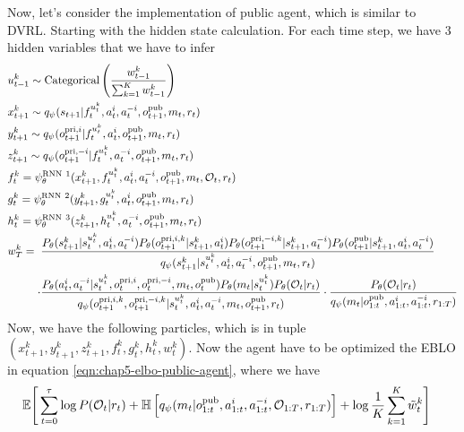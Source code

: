\label{sec:chap5-public-agent-implementation}
Now, let's consider the implementation of public agent, which is similar to DVRL. Starting with the hidden state calculation. For each time step, we have 3 hidden variables that we have to infer
\begin{equation}
\begin{aligned}
    &u^k_{t-1} \sim \text{Categorical}\left( \frac{w^k_{t-1}}{\sum^K_{k=1}w^k_{t-1}} \right) \\
    &x^k_{t+1} \sim q_\psi(s_{t+1} | f^{u^k_t}_t, a^i_t, a^{-i}_t, o^{\operatorname{pub}}_{t+1}, m_t, r_t) \\
    &y^k_{t+1} \sim q_\psi(o^{\operatorname{pri}, i}_{t+1} | f^{u^k_t}_t, a^i_t, o^{\operatorname{pub}}_{t+1}, m_t, r_t) \\ 
    &z^k_{t+1} \sim q_\psi(o^{\operatorname{pri}, -i}_{t+1} | f^{u^k_t}_t, a^{-i}_t, o^{\operatorname{pub}}_{t+1}, m_t, r_t) \\
    &f^k_t = \psi^{\text{RNN} \ 1}_\theta (x^k_{t+1}, f^{u^k_t}_t, a^i_t, a^{-i}_t, o^{\operatorname{pub}}_{t+1}, m_t, \mathcal{O}_t, r_t) \\
    &g^k_t = \psi^{\text{RNN} \ 2}_\theta (y^k_{t+1}, g^{u^k_t}_t, a^i_t, o^{\operatorname{pub}}_{t+1}, m_t, r_t) \\
    &h^k_t = \psi^{\text{RNN} \ 3}_\theta (z^k_{t+1}, h^{u^k_t}_t, a^{-i}_t, o^{\operatorname{pub}}_{t+1}, m_t, r_t) \\
    &w^k_T = \begin{aligned}[t]
        &\frac{P_\theta(s_{t+1}^k | s_t^{u^k_t}, a_t^i, a_t^{-i})P_\theta(o^{\operatorname{pri}, i, k}_{t+1} | s_{t+1}^k, a^i_t) P_\theta(o^{\operatorname{pri}, -i, k}_{t+1} | s_{t+1}^k, a^{-i}_t) P_\theta(o^{\operatorname{pub}}_{t+1} | s_{t+1}^k, a^i_t, a^{-i}_t)}{q_\psi(s_{t+1}^k | s_t^{u^k_t}, a^i_t, a^{-i}_t, o^{\operatorname{pub}}_{t+1}, m_t, r_t)} \\
        \cdot&\frac{P_\theta(a^i_t, a^{-i}_t | s_t^{u^k_t}, o^{\operatorname{pri}, i}_t, o^{\operatorname{pri}, -i}_t, m_t, o^{\operatorname{pub}}_t) P_\theta(m_t | s_t^{u^k_t}) P_\theta(\mathcal{O}_t | r_t)}{q_\psi(o^{\operatorname{pri}, i, k}_{t+1}, o^{\operatorname{pri}, -i, k}_{t+1} | s_t^{u^k_t}, a^i_t, a^{-i}_t, m_t, o^{\operatorname{pub}}_{t+1}, r_t)} \cdot \frac{P_\theta(\mathcal{O}_t | r_t)}{q_\psi(m_t | o^{\operatorname{pub}}_{1:t}, a^{i}_{1:t}, a^{-i}_{1:t}, r_{1:T})}
    \end{aligned}
\end{aligned}
\end{equation}
Now, we have the following particles, which is in tuple $(x^k_{t+1}, y^k_{t+1}, z^k_{t+1}, f^k_t, g^k_t, h^k_t, w^k_t)$. Now the agent have to be optimized the EBLO in equation \ref{eqn:chap5-elbo-public-agent}, where we have 
\begin{equation}
\begin{aligned}
\label{eqn:chap5-elbo-public-agent}
    \mathbb{E}\Bigg[\sum^\tau_{t=0} &\log P(\mathcal{O}_t | r_t) + \mathbb{H}\left[ q_\psi(m_t | o^{\operatorname{pub}}_{1:t}, a^{i}_{1:t}, a^{-i}_{1:t}, \mathcal{O}_{1:T}, r_{1:T}) \right] + \log \frac{1}{K} \sum ^K_{k=1}\tilde{w}_t^k\Bigg]
\end{aligned}
\end{equation}
